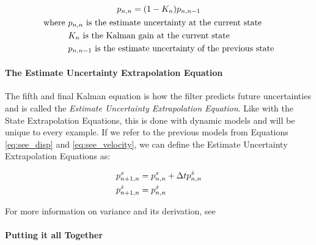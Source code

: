         \begin{gather}
            p_{n,n} = (1-K_n)p_{n,n-1} \\
            \begin{aligned}
                \text{where } &p_{n,n} \text{ is the estimate uncertainty at the current state} \\
                              &K_n \text{ is the Kalman gain at the current state} \\
                              &p_{n,n-1} \text{ is the estimate uncertainty of the previous state}
            \end{aligned} \notag
        \end{gather}

        \paragraph*{The Estimate Uncertainty Extrapolation Equation} The fifth and final Kalman equation is how the filter predicts future uncertainties and is called the \textit{Estimate Uncertainty Extrapolation Equation}. 
        Like with the State Extrapolation Equations, this is done with dynamic models and will be unique to every example.
        If we refer to the previous models from Equations \ref{eq:see_disp} and \ref{eq:see_velocity}, we can define the Estimate Uncertainty Extrapolation Equations as:

        \begin{subequations}
            \labeq{covariance_extrapolation}
            \begin{align}
                p_{n+1,n}^x &= p_{n,n}^x + \Delta t p_{n,n}^{\dot{x}} \\
                p_{n+1,n}^{\dot{x}} &= p_{n,n}^{\dot{x}}
            \end{align}
        \end{subequations}

        For more information on variance and its derivation, see 

        \paragraph*{Putting it all Together}

